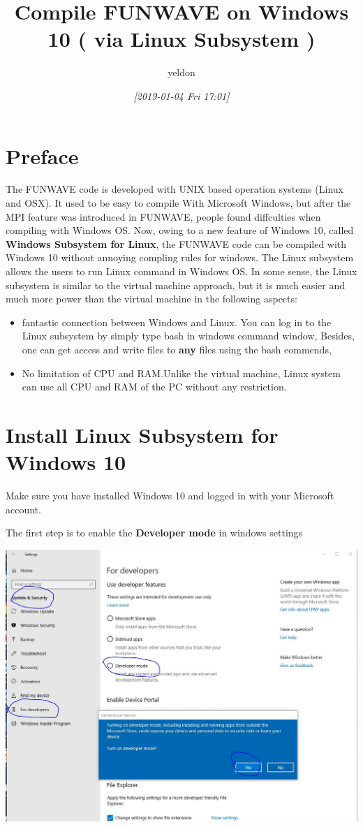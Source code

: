 \documentclass[11pt]{article}
\author{yeldon}
\date{\textit{[2019-01-04 Fri 17:01]}}
\title{Compile FUNWAVE on Windows 10 ( via Linux Subsystem )}
\begin{document}
\maketitle
\tableofcontents


\section{Preface}
\label{sec:orgd72de78}

The FUNWAVE code is developed with UNIX based operation systems (Linux and OSX).
It used to be easy to compile With Microsoft Windows, but after the MPI feature was
introduced in FUNWAVE, people found diffculties when compiling with Windows OS.
Now, owing to a new feature of Windows 10, called \textbf{Windows Subsystem for Linux},
the FUNWAVE code can be compiled with Windows 10 without annoying
compling rules for windows. The Linux subsystem allows the users to run Linux command in Windows OS. In some sense, the Linux subsystem is similar to the 
virtual machine approach, but it is much easier and much more power than the
virtual machine in the following aspects:

\begin{itemize}
\item fantastic connection between Windows and Linux. You can log in to the Linux
subsystem by simply type bash in windows command window, Besides, one can
get access and write files to \textbf{any} files using the bash commends,
\item No limitation of CPU and RAM.Unlike the virtual machine, Linux system can use
all CPU and RAM of the PC without any restriction.
\end{itemize}

\section{Install Linux Subsystem for Windows 10}
\label{sec:org2fdcf26}

Make sure you have installed Windows 10 and logged in with your Microsoft
account.

The first step is to enable the \textbf{Developer mode} in windows settings

\begin{center}
\includegraphics[width=.9\linewidth]{./funwave_img/1.JPG}
\end{center}
\end{document}
